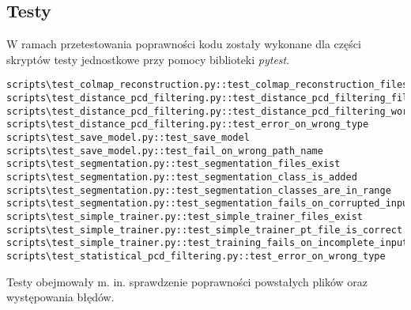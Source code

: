 \subsection{Testy}

W ramach przetestowania poprawności kodu zostały wykonane dla części skryptów testy jednostkowe przy pomocy biblioteki \textit{pytest}.

\lstset{style=basicstyle}
\begin{lstlisting}
scripts\test_colmap_reconstruction.py::test_colmap_reconstruction_files_exist 
scripts\test_distance_pcd_filtering.py::test_distance_pcd_filtering_files_exist 
scripts\test_distance_pcd_filtering.py::test_distance_pcd_filtering_works 
scripts\test_distance_pcd_filtering.py::test_error_on_wrong_type 
scripts\test_save_model.py::test_save_model 
scripts\test_save_model.py::test_fail_on_wrong_path_name 
scripts\test_segmentation.py::test_segmentation_files_exist 
scripts\test_segmentation.py::test_segmentation_class_is_added 
scripts\test_segmentation.py::test_segmentation_classes_are_in_range 
scripts\test_segmentation.py::test_segmentation_fails_on_corrupted_input 
scripts\test_simple_trainer.py::test_simple_trainer_files_exist 
scripts\test_simple_trainer.py::test_simple_trainer_pt_file_is_correct 
scripts\test_simple_trainer.py::test_training_fails_on_incomplete_input 
scripts\test_statistical_pcd_filtering.py::test_error_on_wrong_type 
\end{lstlisting}

Testy obejmowały m. in. sprawdzenie poprawności powstałych plików oraz występowania błędów. 